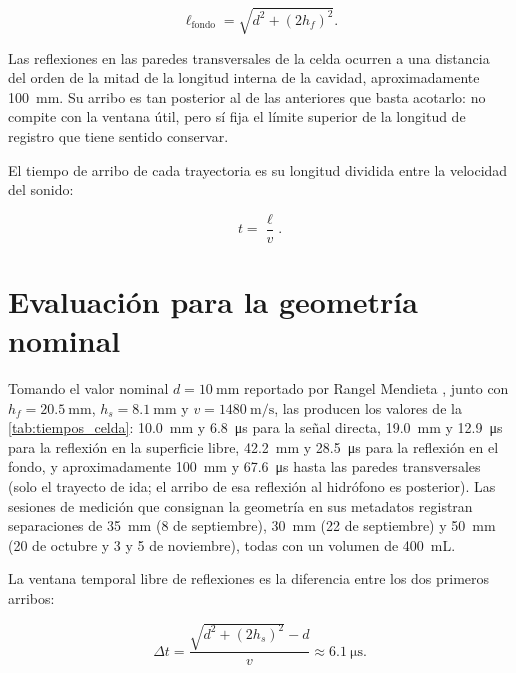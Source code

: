 \begin{equation}
    \ell_{\text{fondo}} = \sqrt{d^{2} + (2h_f)^{2}}.
    \label{eq:traj_fondo}
\end{equation}

Las reflexiones en las paredes transversales de la celda ocurren a una
distancia del orden de la mitad de la longitud interna de la cavidad,
aproximadamente \SI{100}{\milli\meter}. Su arribo es tan posterior al
de las anteriores que basta acotarlo: no compite con la ventana útil,
pero sí fija el límite superior de la longitud de registro que tiene
sentido conservar.

El tiempo de arribo de cada trayectoria es su longitud dividida entre
la velocidad del sonido:

\begin{equation}
    t = \frac{\ell}{v}.
    \label{eq:tiempo_arribo}
\end{equation}

\section*{Evaluación para la geometría nominal}

Tomando el valor nominal $d = \SI{10}{\milli\meter}$ reportado por
Rangel Mendieta \cite{Rangel2023}, junto con
$h_f = \SI{20.5}{\milli\meter}$, $h_s = \SI{8.1}{\milli\meter}$ y
$v = \SI{1480}{\meter\per\second}$, las
 producen los valores de
la \cref{tab:tiempos_celda}: \SI{10.0}{\milli\meter} y
\SI{6.8}{\micro\second} para la señal directa,
\SI{19.0}{\milli\meter} y \SI{12.9}{\micro\second} para la reflexión
en la superficie libre, \SI{42.2}{\milli\meter} y
\SI{28.5}{\micro\second} para la reflexión en el fondo, y
aproximadamente \SI{100}{\milli\meter} y \SI{67.6}{\micro\second}
hasta las paredes transversales (solo el trayecto de ida; el arribo de
esa reflexión al hidrófono es posterior). Las sesiones de medición que
consignan la geometría en sus metadatos registran separaciones de
\SI{35}{\milli\meter} (8 de septiembre), \SI{30}{\milli\meter} (22 de
septiembre) y \SI{50}{\milli\meter} (20 de octubre y 3 y 5 de
noviembre), todas con un volumen de \SI{400}{\milli\liter}.

La ventana temporal libre de reflexiones es la diferencia entre los dos
primeros arribos:

\begin{equation}
    \Delta t = \frac{\sqrt{d^{2} + (2h_s)^{2}} - d}{v}
             \approx \SI{6.1}{\micro\second}.
    \label{eq:ventana_util}
\end{equation}


